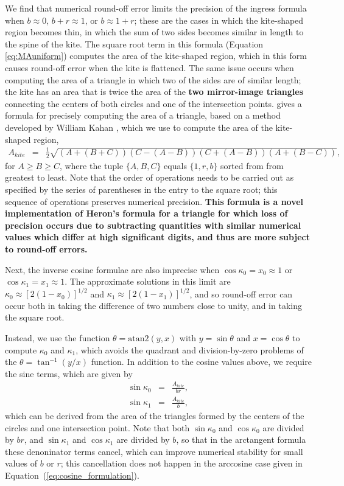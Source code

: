 \documentclass[modern,trackchanges]{aastex63}
\begin{document}
We find that numerical round-off error limits the precision of the ingress formula when
$b \approx 0$, $b+r \approx 1$, or $b \approx 1+r$;  these are the cases in which
the kite-shaped region becomes thin, in which the sum of two sides becomes similar
in length to the spine of the kite.  The square root term in this formula (Equation
\ref{eq:MAuniform}) computes the area of the kite-shaped region, which in this
form causes round-off error when the kite is flattened.  The same issue occurs when
computing the area of a triangle in which two of the sides are of similar length;
the kite has an area that is twice the area of the {\bf two mirror-image triangles}
connecting the centers
of both circles and one of the intersection points.  \cite{Goldberg1991} gives a
formula for precisely computing the area of a triangle, based on a method developed
by William Kahan \citep[later described in][]{Kahan2000}, which we use to compute
the area of the kite-shaped region,
\begin{eqnarray}\label{eq:Kite_area}
A_{kite} &=& \frac{1}{2}\sqrt{(A+(B+C))(C-(A-B))(C+(A-B))(A+(B-C))},
\end{eqnarray}
for $A \ge B \ge C$, where the tuple $\{A,B,C\}$ equals $\{1,r,b\}$
sorted from from greatest to least.  Note that the order of operations
needs to be carried out as specified by the series of parentheses in
the entry to the square root;  this sequence of operations preserves
numerical precision. {\bf This formula is a novel implementation of Heron's
formula for a triangle for which loss of precision occurs due to subtracting 
quantities with similar numerical values which differ at high significant digits,
and thus are more subject to round-off errors.}

Next, the inverse cosine formulae are also imprecise when $\cos{\kappa_0} = x_0 \approx
1$ or $\cos{\kappa_1} = x_1 \approx 1$.  The approximate solutions in this limit
are $\kappa_0 \approx [2(1-x_0)]^{1/2}$ and $\kappa_1 \approx [2(1-x_1)]^{1/2}$, and so round-off
error can occur both in taking the difference of two numbers close to unity,
and in taking the square root.

Instead, we use the function $\theta = \mathrm{atan2}(y,x)$ with $y=\sin{\theta}$ and
$x=\cos{\theta}$ to compute $\kappa_0$ and $\kappa_1$, which avoids the quadrant and
division-by-zero problems of the $\theta = \tan^{-1}(y/x)$ function.  In addition
to the cosine values above, we require the sine terms, which are given by
\begin{eqnarray}
\sin{\kappa_0} &=& \frac{A_{kite}}{br},\nonumber\\
\sin{\kappa_1} &=& \frac{A_{kite}}{b},
\end{eqnarray}
which can be derived from the area of the triangles formed by the centers of
the circles and one intersection point.
Note that both $\sin{\kappa_0}$ and $\cos{\kappa_0}$ are divided by $br$, and
$\sin{\kappa_1}$ and $\cos{\kappa_1}$ are divided by $b$, so that
in the arctangent formula these denoninator terms cancel, which can improve
numerical stability for small values of $b$ or $r$; this cancellation does not happen
in the arccosine case given in Equation~(\ref{eq:cosine_formulation}).
\end{document}
